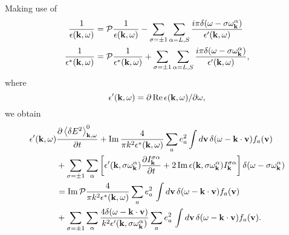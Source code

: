 \documentclass[12pt,a4paper,ruledheader]{report}
\begin{document}
Making use of
\begin{equation}
  \label{principal}
  \begin{split}
    \frac{1}{\epsilon({\bf k},\omega)}
    &=\mathcal{P}  \frac{1}{\epsilon({\bf k},\omega)}
    -\sum_{\sigma=\pm 1}\sum_{\alpha=L,S}
    \frac{i\pi \delta(\omega-\sigma\omega_{\bf k}^\alpha)}{\epsilon '({\bf k},\omega)}\\
    \frac{1}{\epsilon^*({\bf k},\omega)}
    &=\mathcal{P}\frac{1}{\epsilon^*({\bf k},\omega)}
    +\sum_{\sigma=\pm 1}\sum_{\alpha=L,S}
    \frac{i\pi \delta(\omega-\sigma\omega_{\bf k}^\alpha)}{\epsilon '({\bf k},\omega)},
  \end{split}
\end{equation}
where
\begin{displaymath}
  \epsilon '({\bf k},\omega)=\partial\,
  \mbox{Re}\, \epsilon({\bf k},\omega)/\partial \omega,
\end{displaymath}
we obtain
\begin{equation}
  \label{noneigenmode-ql}
  \begin{split}
 \epsilon '({\bf k},\omega)
  &\frac{\partial \left< \delta E^2 \right>_{{\bf k},\omega}^0}{\partial t}
  + \mbox{Im}\,\frac{4}{\pi k^2\epsilon^*({\bf k},\omega)}
  \sum_ae_a^2 \int d{\bf v}\, \delta(\omega-{\bf k \cdot v})f_a({\bf v})\\
  &+\sum_{\sigma=\pm 1}\sum_\alpha\left[
    \epsilon '({\bf k},\sigma\omega_{\bf k}^\alpha)
    \frac{\partial I_{\bf k}^{\sigma \alpha}}{\partial t}
    +2\,\mbox{Im}\,\epsilon({\bf k},\sigma\omega_{\bf k}^\alpha)
    I_{\bf k}^{\sigma \alpha}\right]\delta(\omega-\sigma\omega_{\bf k}^\alpha)\\
  &=\mbox{Im}\,\mathcal{P} \frac{4}{\pi k^2\epsilon^{*}({\bf k},\omega)}
  \sum_a e^2_a\, \int d{\bf v}\,\delta(\omega-{\bf k \cdot v})f_a({\bf v})\\
  & +\sum_{\sigma=\pm 1}\sum_\alpha
  \frac{4\delta(\omega-{\bf k \cdot v})}
  {k^2\epsilon '({\bf k},\sigma\omega_{\bf k}^\alpha)}
  \sum_a e^2_a\, \int d{\bf v}\,\delta(\omega-{\bf k \cdot v})f_a({\bf v}).
\end{split}
\end{equation}
\end{document}
